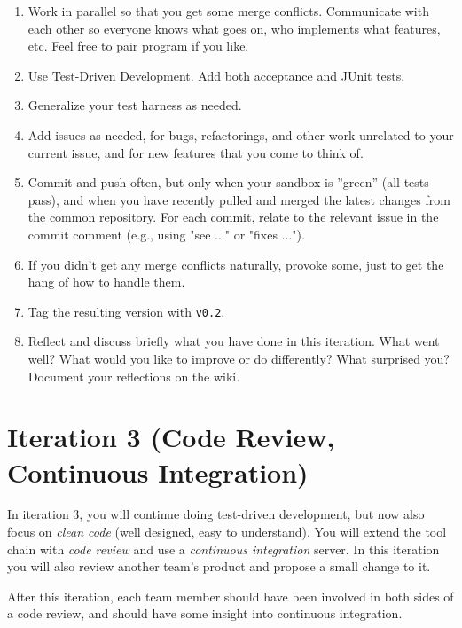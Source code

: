 \documentclass[swedish,english]{article}
\begin{document}
\begin{enumerate}
\item Work in parallel so that you get some merge conflicts. Communicate with each other so everyone knows what goes on, who implements what features, etc. Feel free to pair program if you like.
\item Use Test-Driven Development. Add both acceptance and JUnit tests.
\item Generalize your test harness as needed.
\item Add issues as needed, for bugs, refactorings, and other work unrelated to your current issue, and for new features that you come to think of. 
\item Commit and push often, but only when your sandbox is ''green'' (all tests pass), and when you have recently pulled and merged the latest changes from the common repository. For each commit, relate to the relevant issue in the commit comment (e.g., using "see ..." or "fixes ...").
\item If you didn't get any merge conflicts naturally, provoke some, just to get the hang of how to handle them.
\item Tag the resulting version with \verb'v0.2'.
\item Reflect and discuss briefly what you have done in this iteration. What went well? What would you like to improve or do differently? What surprised you? Document your reflections on the wiki.
\end{enumerate}

\section*{Iteration 3 (Code Review, Continuous Integration)}
In iteration 3, you will continue doing test-driven development, but now also focus on \emph{clean code} (well designed, easy to understand). You will extend the tool chain with \emph{code review} and use a \emph{continuous integration} server. In this iteration you will also review another team's product and propose a small change to it.

After this iteration, each team member should have been involved in both sides of a code review, and should have some insight into continuous integration.
\end{document}
